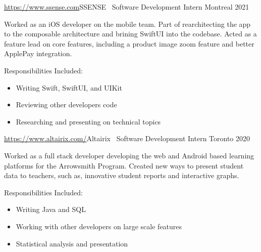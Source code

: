 \documentclass[]{style}
\begin{document}
\begin{entrylist}


\vspace{2mm}

\entry
{\url{https://www.ssense.com}{SSENSE} \ {\normalfont Software Development Intern}\vspace{1mm}}
{Montreal 2021}
{Worked as an iOS developer on the mobile team. Part of rearchitecting the app to the composable architecture and brining SwiftUI into the codebase. Acted as a feature lead on core features, including a product image zoom feature and better ApplePay integration.
~ \vspace{1mm}

Responsibilities Included:

\begin{itemize}
	\item Writing Swift, SwiftUI, and UIKit
	\item Reviewing other developers code
	\item Researching and presenting on technical topics
\end{itemize}}



\entry
{\url{https://www.altairix.com/}{Altairix} \ {\normalfont Software Development Intern} \vspace{1mm}}
{Toronto 2020}
{Worked as a full stack developer developing the web and Android based learning platforms for the Arrowsmith Program. Created new ways to present student data to teachers, such as, innovative student reports and interactive graphs.
~ \vspace{1mm}

Responsibilities Included:

\begin{itemize}
	\item Writing Java and SQL
	\item Working with other developers on large scale features
	\item Statistical analysis and presentation
\end{itemize}}



\end{entrylist}
\end{document}
